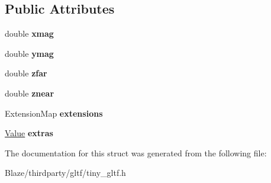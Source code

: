 \subsection*{Public Attributes}
\begin{DoxyCompactItemize}
\item 
\mbox{\label{structtinygltf_1_1OrthographicCamera_a0ea904ecb69217f1909604880aa58f27}} 
double {\bfseries xmag}
\item 
\mbox{\label{structtinygltf_1_1OrthographicCamera_a5a2ab718624cbba134b189d09e7f6b24}} 
double {\bfseries ymag}
\item 
\mbox{\label{structtinygltf_1_1OrthographicCamera_a290b8d3f867255603b0f590058b08fb5}} 
double {\bfseries zfar}
\item 
\mbox{\label{structtinygltf_1_1OrthographicCamera_a3b5c29e53238a3a8f93db68ce61fdf9b}} 
double {\bfseries znear}
\item 
\mbox{\label{structtinygltf_1_1OrthographicCamera_af603057c69ad85e522f083a24e65be56}} 
Extension\+Map {\bfseries extensions}
\item 
\mbox{\label{structtinygltf_1_1OrthographicCamera_abe76b162609c0c271e49d419f13c2e49}} 
\hyperlink{classtinygltf_1_1Value}{Value} {\bfseries extras}
\end{DoxyCompactItemize}


The documentation for this struct was generated from the following file\+:\begin{DoxyCompactItemize}
\item 
Blaze/thirdparty/gltf/tiny\+\_\+gltf.\+h\end{DoxyCompactItemize}
